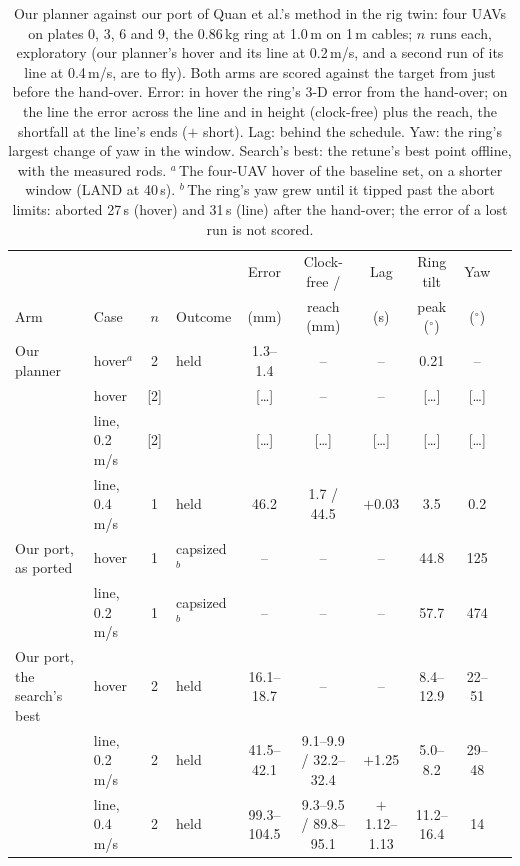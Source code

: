 \begin{table}[htbp]
\centering
\footnotesize
\setlength{\tabcolsep}{2.6pt}
\caption[Our planner against our port in the twin]{Our planner against our port of Quan et al.'s method in the rig
twin: four UAVs on plates 0, 3, 6 and 9, the 0.86\,kg ring at 1.0\,m on 1\,m cables; $n$ runs each, exploratory (our
planner's hover and its line at 0.2\,m/s, and a second run of its line at 0.4\,m/s, are to fly). Both arms are scored
against the target from just before the hand-over. Error: in hover the ring's 3-D error from the hand-over; on the
line the error across the line and in height (clock-free) plus the reach, the shortfall at the line's ends ($+$ short).
Lag: behind the schedule. Yaw: the ring's largest change of yaw in the window. Search's best: the retune's best point
offline, with the measured rods. $^a$\,The four-UAV hover of the baseline set, on a shorter window (LAND at 40\,s). $^b$\,The ring's yaw grew until
it tipped past the abort limits: aborted 27\,s (hover) and 31\,s (line) after the hand-over; the error of a lost run is
not scored.}
\label{tab:compare_twin}
\begin{tabularx}{\textwidth}{>{\raggedright\arraybackslash}p{1.9cm}>{\raggedright\arraybackslash}p{1.3cm}c>{\raggedright\arraybackslash}Xcccccc}
\toprule
 & & & & Error & Clock-free / & Lag & Ring tilt & Yaw \\
Arm & Case & $n$ & Outcome & (mm) & reach (mm) & (s) & peak ($^\circ$) & ($^\circ$) \\
\midrule
Our planner & hover$^a$ & 2 & held & 1.3--1.4 & -- & -- & 0.21 & -- \\
 & hover & [2] & [to fly] & [\dots] & -- & -- & [\dots] & [\dots] \\
 & line, 0.2\,m/s & [2] & [to fly] & [\dots] & [\dots] & [\dots] & [\dots] & [\dots] \\
 & line, 0.4\,m/s & 1 & held & 46.2 & 1.7 / 44.5 & $+$0.03 & 3.5 & 0.2 \\
\addlinespace
Our port, as ported & hover & 1 & capsized$^b$ & -- & -- & -- & 44.8 & 125 \\
 & line, 0.2\,m/s & 1 & capsized$^b$ & -- & -- & -- & 57.7 & 474 \\
\addlinespace
Our port, the search's best & hover & 2 & held & 16.1--18.7 & -- & -- & 8.4--12.9 & 22--51 \\
 & line, 0.2\,m/s & 2 & held & 41.5--42.1 & 9.1--9.9 / 32.2--32.4 & $+$1.25 & 5.0--8.2 & 29--48 \\
 & line, 0.4\,m/s & 2 & held & 99.3--104.5 & 9.3--9.5 / 89.8--95.1 & $+$1.12--1.13 & 11.2--16.4 & 14 \\
\bottomrule
\end{tabularx}
\end{table}
